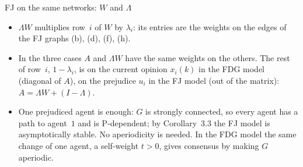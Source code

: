\begin{frame}[label=m-fj-matrices]{FJ on the same networks: $W$ and $\Lambda$}
  \smallskip
  \scriptsize
  \begin{itemize}
    \setlength{\itemsep}{1pt}
    \item $\Lambda W$ multiplies row~$i$ of $W$ by $\lambda_i$: its entries are the weights
          on the edges of the FJ graphs (b), (d), (f), (h).
    \item In the three cases $A$ and $\Lambda W$ have the same weights on the others. The rest of row~$i$,
          $1 - \lambda_i$, is on the current opinion $x_i(k)$ in the FDG model (diagonal of
          $A$), on the prejudice $u_i$ in the FJ model (out of the matrix):
          $A = \Lambda W + (I - \Lambda)$.
    \item \alert{One prejudiced agent is enough}: $G$ is strongly connected, so every agent
          has a path to agent~$1$ and is P-dependent; by Corollary~3.3 the FJ model is
          asymptotically stable. No aperiodicity is needed. In the FDG model the same
          change of one agent, a self-weight $t > 0$, gives consensus by making $G$
          aperiodic.
  \end{itemize}
\end{frame}

